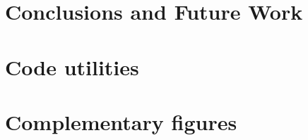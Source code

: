 \documentclass[12pt,letterpaper,oneside]{book}
\begin{document}
\chapter{Conclusions and Future Work}



\appendix
\appendixpage
\noappendicestocpagenum
\addappheadtotoc

\chapter{Code utilities}


\chapter{Complementary figures}





\end{document}
